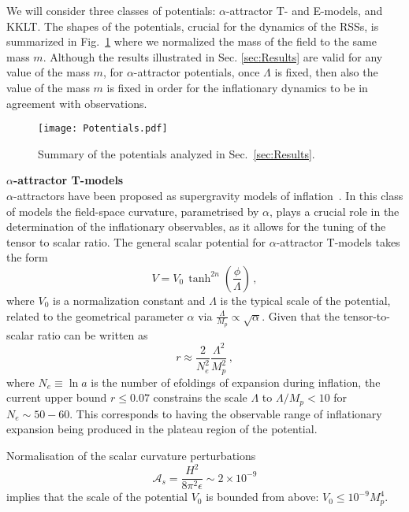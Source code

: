 \documentclass[11pt,a4paper]{article}
\begin{document}
We will consider three classes of potentials: $\alpha$-attractor T- and E-models, and KKLT. The shapes of the potentials, crucial for the dynamics of the RSSs, is summarized in Fig.~\ref{fig:Potentials} where we normalized the mass of the field to the same mass $m$. Although the results illustrated in Sec. \ref{sec:Results} are valid for any value of the mass $m$, for $\alpha$-attractor potentials, once $\Lambda$ is fixed, then also the value of the mass $m$ is fixed in order for the inflationary dynamics to be in agreement with observations.\\

\begin{figure}[htp!]
    \centering
    \texttt{[image: Potentials.pdf]}
    \caption{Summary of the potentials analyzed in Sec.~\ref{sec:Results}.}
\label{fig:Potentials}
\end{figure}


\noindent \textbf{$\alpha$-attractor T-models}\\
\noindent $\alpha$-attractors have been proposed as supergravity models of inflation~\cite{Kallosh:2013yoa, Kallosh:2015lwa}. In this class of models the field-space curvature, parametrised by $\alpha$, plays a crucial role in the determination of the inflationary observables, as it allows for the tuning of the tensor to scalar ratio. The general scalar potential for $\alpha$-attractor T-models takes the form
\begin{equation}
V = V_0 \, \tanh^{2n} \left(\frac{\phi}{\Lambda}\right) \,,
\end{equation}
where $V_0$ is a normalization constant and $\Lambda$ is the typical scale of the potential, related to the geometrical parameter $\alpha$ via $\frac{\Lambda}{M_p}\propto \sqrt{\alpha}$. Given that the tensor-to-scalar ratio can be written as 
\begin{equation}
r\approx \frac{2}{N_e^2} \frac{\Lambda^2}{M_p^2} \,,
\end{equation}
where $N_e\equiv \ln a$ is the number of efoldings of expansion during inflation, the current upper bound $r\le 0.07$ constrains the scale $\Lambda$ to $\Lambda/M_p < 10$ for $N_e\sim 50-60$. This corresponds to having the observable range of inflationary expansion being produced in the plateau region of the potential.

Normalisation of the scalar curvature perturbations 
\begin{equation}
\mathcal{A}_s=\frac{H^2}{8 \pi^2 \epsilon}\sim 2\times 10^{-9}
\label{eq:As}
\end{equation}
implies that the scale of the potential $V_0$ is bounded from above: $V_0\le 10^{-9} M_p^4$.
\end{document}
